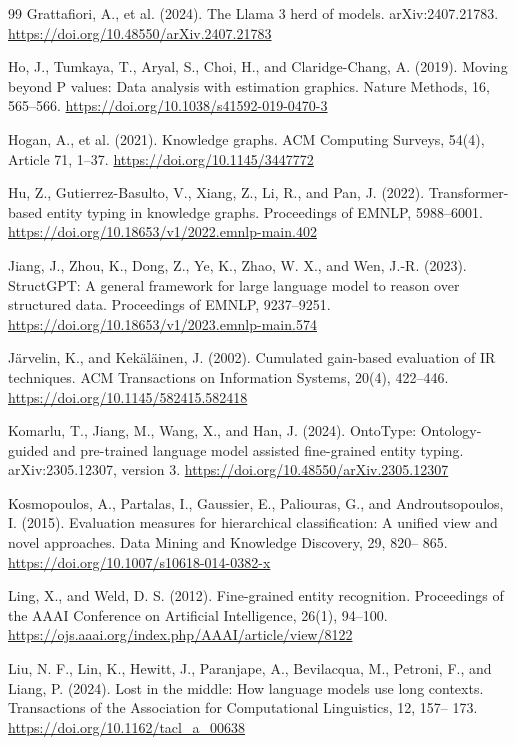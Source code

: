 \begin{thebibliography}{99}
Grattafiori, A., et al. (2024). The Llama 3 herd of models. arXiv:2407.21783. \url{https://doi.org/10.48550/arXiv.2407.21783}

Ho, J., Tumkaya, T., Aryal, S., Choi, H., and Claridge-Chang, A. (2019). Moving beyond P values: Data analysis with estimation graphics. Nature Methods, 16, 565–566. \url{https://doi.org/10.1038/s41592-019-0470-3}

Hogan, A., et al. (2021). Knowledge graphs. ACM Computing Surveys, 54(4), Article 71, 1–37. \url{https://doi.org/10.1145/3447772}

Hu, Z., Gutierrez-Basulto, V., Xiang, Z., Li, R., and Pan, J. (2022). Transformer-based entity typing in knowledge graphs. Proceedings of EMNLP, 5988–6001. \url{https://doi.org/10.18653/v1/2022.emnlp-main.402}

Jiang, J., Zhou, K., Dong, Z., Ye, K., Zhao, W. X., and Wen, J.-R. (2023). StructGPT: A general framework for large language model to reason over structured data. Proceedings of EMNLP, 9237–9251. \url{https://doi.org/10.18653/v1/2023.emnlp-main.574}

Järvelin, K., and Kekäläinen, J. (2002). Cumulated gain-based evaluation of IR techniques. ACM Transactions on Information Systems, 20(4), 422–446. \url{https://doi.org/10.1145/582415.582418}

Komarlu, T., Jiang, M., Wang, X., and Han, J. (2024). OntoType: Ontology-guided and pre-trained language model assisted fine-grained entity typing. arXiv:2305.12307, version 3. \url{https://doi.org/10.48550/arXiv.2305.12307}

Kosmopoulos, A., Partalas, I., Gaussier, E., Paliouras, G., and Androutsopoulos, I. (2015). Evaluation measures for hierarchical classification: A unified view and novel approaches. Data Mining and Knowledge Discovery, 29, 820– 865. \url{https://doi.org/10.1007/s10618-014-0382-x}

Ling, X., and Weld, D. S. (2012). Fine-grained entity recognition. Proceedings of the AAAI Conference on Artificial Intelligence, 26(1), 94–100. \url{https://ojs.aaai.org/index.php/AAAI/article/view/8122}

Liu, N. F., Lin, K., Hewitt, J., Paranjape, A., Bevilacqua, M., Petroni, F., and Liang, P. (2024). Lost in the middle: How language models use long contexts. Transactions of the Association for Computational Linguistics, 12, 157– 173. \url{https://doi.org/10.1162/tacl_a_00638}


\end{thebibliography}
